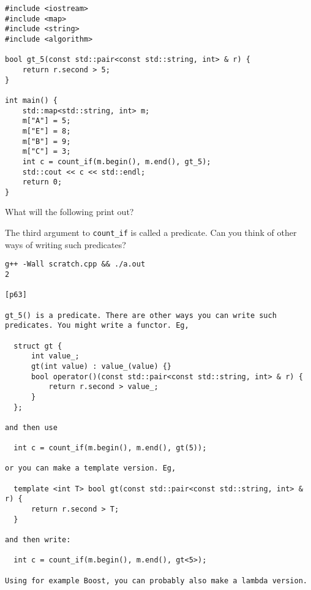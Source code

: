 \documentclass[landscape]{slides}
\begin{document}
\begin{slide}
\begin{lstlisting}
#include <iostream>
#include <map>
#include <string>
#include <algorithm>

bool gt_5(const std::pair<const std::string, int> & r) {
    return r.second > 5;
}

int main() {
    std::map<std::string, int> m;
    m["A"] = 5;
    m["E"] = 8;
    m["B"] = 9;
    m["C"] = 3;
    int c = count_if(m.begin(), m.end(), gt_5);
    std::cout << c << std::endl;
    return 0;
}
\end{lstlisting}

What will the following print out? 

The third argument to \verb!count_if! is called a predicate. Can you think of other ways of writing such predicates?

\begin{note}
\begin{tiny}
\begin{verbatim}
g++ -Wall scratch.cpp && ./a.out
2

[p63]

gt_5() is a predicate. There are other ways you can write such
predicates. You might write a functor. Eg,

  struct gt {
      int value_;
      gt(int value) : value_(value) {}
      bool operator()(const std::pair<const std::string, int> & r) {
          return r.second > value_;
      }
  };

and then use

  int c = count_if(m.begin(), m.end(), gt(5));

or you can make a template version. Eg,

  template <int T> bool gt(const std::pair<const std::string, int> & r) {
      return r.second > T;
  }

and then write:

  int c = count_if(m.begin(), m.end(), gt<5>);

Using for example Boost, you can probably also make a lambda version.
\end{verbatim}
\end{tiny}
\end{note}

\end{slide}

%
%
%
%
%
%
%
\end{document}
